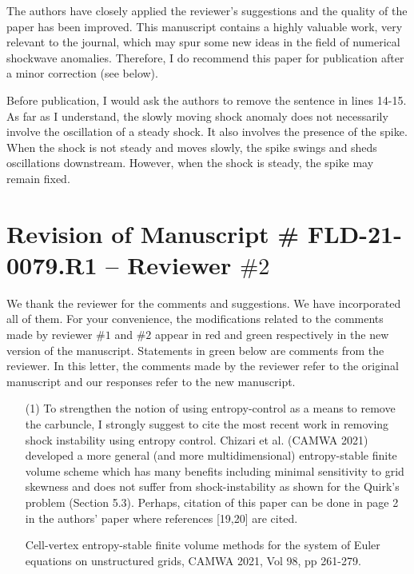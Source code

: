 \documentclass[english,11pt]{article}
\begin{document}
{\color{red}
  The authors have closely applied the reviewer's suggestions 
  and the quality of the paper has been improved. This manuscript contains 
  a highly valuable work, very relevant to the journal, which may spur 
  some new ideas in the field of numerical shockwave anomalies. 
  Therefore, I do recommend this paper for publication after a minor correction (see below).

  Before publication, I would ask the authors to remove the sentence in lines 14-15. 
  As far as I understand, the slowly moving shock anomaly does not necessarily 
  involve the oscillation of a steady shock. It also involves the presence of the spike. 
  When the shock is not steady and moves slowly, the spike swings and sheds oscillations 
  downstream. However, when the shock is steady, the spike may remain fixed.
}

\noindent
%




\newpage
\section*{Revision of Manuscript \# FLD-21-0079.R1 -- Reviewer $\#2$}
We thank the reviewer for the comments and suggestions.
We have incorporated all of them.  For your convenience,
the modifications related to the comments made by reviewer $\#1$ and $\#2$
appear in red and green respectively in the new version of the manuscript.
Statements in green below are comments from the reviewer.
In this letter, the comments made by the reviewer refer to the original
manuscript and our responses refer to the new manuscript.

\bigskip
{\color{OliveGreen}
  \begin{itemize}
  \item[(1)]
    To strengthen the notion of using entropy-control as a means to remove the carbuncle, 
    I strongly suggest to cite the most recent work in removing shock instability using 
    entropy control. Chizari et al.
    (CAMWA 2021) developed a more general (and more multidimensional) entropy-stable finite volume
    scheme which has many benefits including minimal sensitivity to grid skewness and does not 
    suffer from shock-instability as shown for the Quirk's problem (Section 5.3). 
    Perhaps, citation of this paper can be done in page 2 in the authors' paper where 
    references [19,20] are cited.

    Cell-vertex entropy-stable finite volume methods for the system of Euler equations 
    on unstructured grids, CAMWA 2021, Vol 98, pp 261-279.
  \end{itemize}
}
\end{document}
